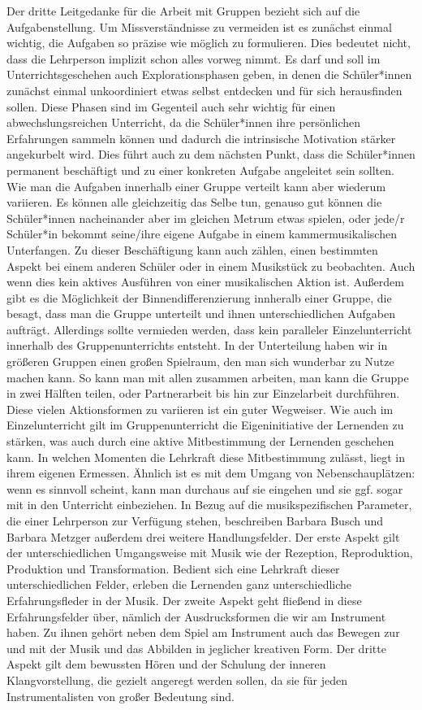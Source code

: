 Der dritte Leitgedanke für die Arbeit mit Gruppen bezieht sich auf die
Aufgabenstellung. Um Missverständnisse zu vermeiden ist es zunächst einmal
wichtig, die Aufgaben so präzise wie möglich zu formulieren. Dies bedeutet
nicht, dass die Lehrperson implizit schon alles vorweg nimmt. Es darf und soll
im Unterrichtsgeschehen auch Explorationsphasen geben, in denen die
Schüler*innen zunächst einmal unkoordiniert etwas selbst entdecken und für sich
herausfinden sollen. Diese Phasen sind im Gegenteil auch sehr wichtig für einen
abwechslungsreichen Unterricht, da die Schüler*innen ihre persönlichen
Erfahrungen sammeln können und dadurch die intrinsische Motivation stärker
angekurbelt wird. Dies führt auch zu dem nächsten Punkt, dass die Schüler*innen
permanent beschäftigt und zu einer konkreten Aufgabe angeleitet sein sollten.
Wie man die Aufgaben innerhalb einer Gruppe verteilt kann aber wiederum
variieren. Es können alle gleichzeitig das Selbe tun, genauso gut können die
Schüler*innen nacheinander aber im gleichen Metrum etwas spielen, oder jede/r
Schüler*in bekommt seine/ihre eigene Aufgabe in einem kammermusikalischen
Unterfangen. Zu dieser Beschäftigung kann auch zählen, einen bestimmten Aspekt
bei einem anderen Schüler oder in einem Musikstück zu beobachten. Auch wenn dies
kein aktives Ausführen von einer musikalischen Aktion ist. Außerdem gibt es die
Möglichkeit der Binnendifferenzierung innheralb einer Gruppe, die besagt, dass
man die Gruppe unterteilt und ihnen unterschiedlichen Aufgaben aufträgt.
Allerdings sollte vermieden werden, dass kein paralleler Einzelunterricht
innerhalb des Gruppenunterrichts entsteht. In der Unterteilung haben wir in
größeren Gruppen einen großen Spielraum, den man sich wunderbar zu Nutze machen
kann. So kann man mit allen zusammen arbeiten, man kann die Gruppe in zwei
Hälften teilen, oder Partnerarbeit bis hin zur Einzelarbeit durchführen. Diese
vielen Aktionsformen zu variieren ist ein guter Wegweiser. Wie auch im
Einzelunterricht gilt im Gruppenunterricht die Eigeninitiative der Lernenden zu
stärken, was auch durch eine aktive Mitbestimmung der Lernenden geschehen kann.
In welchen Momenten die Lehrkraft diese Mitbestimmung zulässt, liegt in ihrem
eigenen Ermessen. Ähnlich ist es mit dem Umgang von Nebenschauplätzen: wenn es
sinnvoll scheint, kann man durchaus auf sie eingehen und sie ggf. sogar mit in
den Unterricht einbeziehen. In Bezug auf die musikspezifischen Parameter, die
einer Lehrperson zur Verfügung stehen, beschreiben Barbara Busch und Barbara
Metzger außerdem drei weitere Handlungsfelder. Der erste Aspekt gilt der
unterschiedlichen Umgangsweise mit Musik wie der Rezeption, Reproduktion,
Produktion und Transformation.\autocite{busch:grundwissen_instrumentalpaedagogik} Bedient sich eine Lehrkraft dieser
unterschiedlichen Felder, erleben die Lernenden ganz unterschiedliche
Erfahrungsfleder in der Musik. Der zweite Aspekt geht fließend in diese
Erfahrungsfelder über, nämlich der Ausdrucksformen die wir am Instrument haben.
Zu ihnen gehört neben dem Spiel am Instrument auch das Bewegen zur und mit der
Musik und das Abbilden in jeglicher kreativen Form. Der dritte Aspekt gilt dem
bewussten Hören und der Schulung der inneren Klangvorstellung, die gezielt
angeregt werden sollen, da sie für jeden Instrumentalisten von großer Bedeutung
sind.

